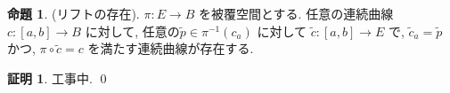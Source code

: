 \documentclass[10pt, fleqn, label-section=none]{bxjsarticle}
\theoremstyle{definition}
\newtheorem{prop}[dfn]{命題}
\newtheorem*{pf*}{証明}
\renewcommand{\;}{\, ; \,}
\begin{document}
\begin{prop}(リフトの存在). $\pi : E \rightarrow B$ を被覆空間とする. 任意の連続曲線$c: [a,b] \rightarrow B$ に対して, 任意の$\tilde p \in \pi ^{-1} (c_a) $ に対して
$\tilde c: [a,b] \rightarrow E$ で, $\tilde c_ a = \tilde p$ かつ, $\pi \circ \tilde c = c$ を満たす連続曲線が存在する.

\end{prop}
\begin{pf*}
工事中.
\qed
\end{pf*}
\end{document}
